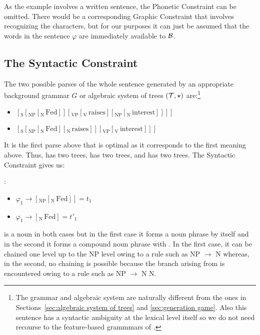 As the example involves a written sentence, the Phonetic Constraint can be omitted. There would be a corresponding Graphic Constraint that involves recognizing the characters, but for our purposes it can just be assumed that the words in the sentence $\varphi$ are immediately available to $\cal B$.


\subsection{The Syntactic Constraint}\largerpage

The two possible parses of the whole sentence generated by an appropriate background grammar $G$ or algebraic system of trees $({\cal T}, \star)$ are:\footnote{The grammar and algebraic system are naturally different from the ones in Sections~\ref{sec:algebraic system of trees} and \ref{sec:generation game}. Also this sentence has a syntactic ambiguity at the lexical level itself so we do not need recourse to the feature-based grammmars of .}

\begin{itemize}

\item $[_{\mathrm{S}}[_{\mathrm{NP}}[_{\mathrm{N}}\, \mathrm{Fed}]][_{\mathrm{VP}}[_{\mathrm{V}}\,\mathrm{raises}][_{\mathrm{NP}}[_{\mathrm{N}}\,\mathrm{interest}]]]]$

\item $[_{\mathrm{S}}[_{\mathrm{NP}}[_{\mathrm{N}}\,\mathrm{Fed}][_{\mathrm{N}}\,\mathrm{raises}]][_{\mathrm{VP}}[_{\mathrm{V}}\,\mathrm{interest}]]]$

\end{itemize}

\noindent It is the first parse above that is optimal as it corresponds to the first meaning above. Thus,  has two trees,  has two trees, and  has two trees. The Syntactic Constraint gives us:

\ea {}:\\
\begin{itemize}
\item $\varphi_1 \longrightarrow [_{\mathrm{NP}}[_{\mathrm{N}}\,\mathrm{Fed}]] = t_1$ 
\item $\varphi_1 \longrightarrow [_{\mathrm{N}}\,\mathrm{Fed}] = t'_1$ 
\end{itemize}
\z

\noindent {} is a noun in both cases but in the first case it forms a noun phrase by itself and in the second it forms a compound noun phrase with . In the first case, it can be chained one level up to the NP level owing to a rule such as NP $\to$ N whereas, in the second, no chaining is possible because the branch arising from  is encountered owing to a rule such as NP $\to$ N N.

